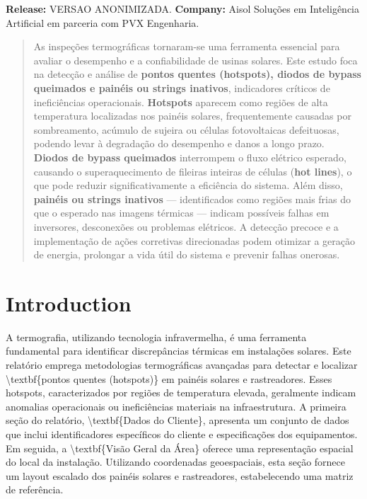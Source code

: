 \documentclass[dvipsnames]{article}%
\begin{document}
\textbf{Release:}%
VERSAO ANONIMIZADA.  %
\textbf{Company:}%
Aisol Soluções em Inteligência Artificial em parceria com PVX Engenharia.  %
\newpage%
\tableofcontents%
\newpage%
\newpage%
\begin{abstract}%
As inspeções termográficas tornaram-se uma ferramenta essencial para avaliar o desempenho e a confiabilidade de usinas solares. Este estudo foca na detecção e análise de \textbf{pontos quentes (hotspots), diodos de bypass queimados e painéis ou strings inativos}, indicadores críticos de ineficiências operacionais. \textbf{Hotspots} aparecem como regiões de alta temperatura localizadas nos painéis solares, frequentemente causadas por sombreamento, acúmulo de sujeira ou células fotovoltaicas defeituosas, podendo levar à degradação do desempenho e danos a longo prazo. \textbf{Diodos de bypass queimados} interrompem o fluxo elétrico esperado, causando o superaquecimento de fileiras inteiras de células (\textbf{hot lines}), o que pode reduzir significativamente a eficiência do sistema. Além disso, \textbf{painéis ou strings inativos} — identificados como regiões mais frias do que o esperado nas imagens térmicas — indicam possíveis falhas em inversores, desconexões ou problemas elétricos. A detecção precoce e a implementação de ações corretivas direcionadas podem otimizar a geração de energia, prolongar a vida útil do sistema e prevenir falhas onerosas.%
\end{abstract}%
\pagestyle{fancy}%
\section{Introduction}%
A termografia, utilizando tecnologia infravermelha, é uma ferramenta fundamental para identificar discrepâncias térmicas em instalações solares. Este relatório emprega metodologias termográficas avançadas para detectar e localizar \textbackslash{}textbf\{pontos quentes (hotspots)\} em painéis solares e rastreadores. Esses hotspots, caracterizados por regiões de temperatura elevada, geralmente indicam anomalias operacionais ou ineficiências materiais na infraestrutura. \newline%
\newline%
A primeira seção do relatório, \textbackslash{}textbf\{Dados do Cliente\}, apresenta um conjunto de dados que inclui identificadores específicos do cliente e especificações dos equipamentos. Em seguida, a \textbackslash{}textbf\{Visão Geral da Área\} oferece uma representação espacial do local da instalação. Utilizando coordenadas geoespaciais, esta seção fornece um layout escalado dos painéis solares e rastreadores, estabelecendo uma matriz de referência. \newline%
\newline%
%
\end{document}
